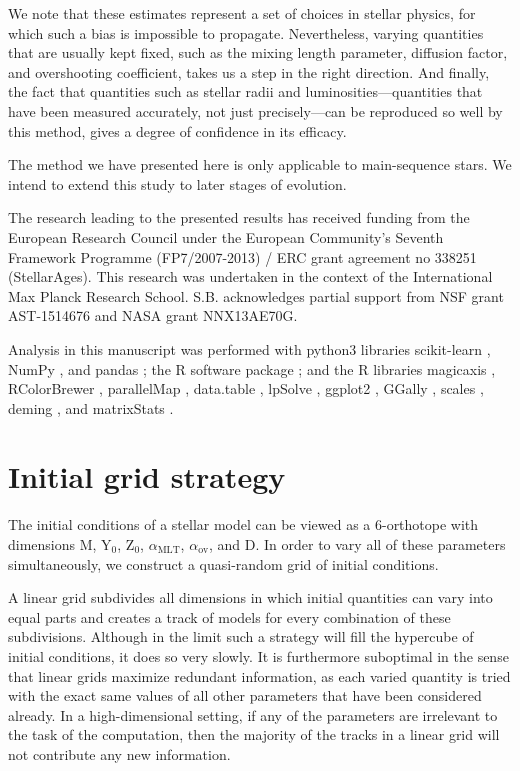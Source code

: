 \documentclass[twocolumn,twocolappendix]{aastex6}
\begin{document}
We note that these estimates represent a set of choices in stellar physics, for which such a bias is impossible to propagate. Nevertheless, varying quantities that are usually kept fixed, such as the mixing length parameter, diffusion factor, and overshooting coefficient, takes us a step in the right direction. And finally, the fact that quantities such as stellar radii and luminosities---quantities that have been measured accurately, not just precisely---can be reproduced so well by this method, gives a degree of confidence in its efficacy. 

The method we have presented here is only applicable to main-sequence stars. We intend to extend this study to later stages of evolution. 


\acknowledgments The research leading to the presented results has received funding from the European Research Council under the European Community's Seventh Framework Programme (FP7/2007-2013) / ERC grant agreement no 338251 (StellarAges). This research was undertaken in the context of the International Max Planck Research School. S.B. acknowledges partial support from NSF grant AST-1514676 and NASA grant NNX13AE70G.

Analysis in this manuscript was performed with python3 libraries scikit-learn \citep{scikit-learn}, NumPy \citep{van2011numpy}, and pandas \citep{mckinney2010data}; the R software package \citep{R}; and the R libraries magicaxis \citep{magicaxis}, RColorBrewer \citep{RColorBrewer}, parallelMap \citep{parallelMap}, data.table \citep{data.table}, lpSolve \citep{lpSolve}, ggplot2 \citep{ggplot2}, GGally \citep{GGally}, scales \citep{scales}, deming \citep{deming}, and matrixStats \citep{matrixStats}. 

\appendix


\section{Initial grid strategy}
\label{sec:grid}
The initial conditions of a stellar model can be viewed as a 6-orthotope with dimensions M, Y$_0$, Z$_0$, $\alpha_{\text{MLT}}$, $\alpha_{\text{ov}}$, and D. In order to vary all of these parameters simultaneously, we construct a quasi-random grid of initial conditions. 

A linear grid subdivides all dimensions in which initial quantities can vary into equal parts and creates a track of models for every combination of these subdivisions. Although in the limit such a strategy will fill the hypercube of initial conditions, it does so very slowly. It is furthermore suboptimal in the sense that linear grids maximize redundant information, as each varied quantity is tried with the exact same values of all other parameters that have been considered already. In a high-dimensional setting, if any of the parameters are irrelevant to the task of the computation, then the majority of the tracks in a linear grid will not contribute any new information.
\end{document}
